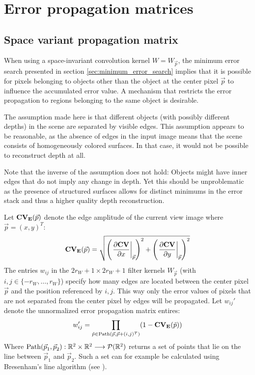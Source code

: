\chapter{Error propagation matrices}

\section{Space variant propagation matrix}

\label{sec:convolution_kernels}

\label{sec:kernels}
When using a space-invariant convolution kernel $W = W_{\vec p}$, the minimum error search presented in section \ref{sec:minimum_error_search} implies that it is possible for pixels belonging to objects other than the object at the center pixel $\vec p$ to influence the accumulated error value. A mechanism that restricts the error propagation to regions belonging to the same object is desirable.

The assumption made here is that different objects (with possibly different depths) in the scene are separated by visible edges. This assumption appears to be reasonable, as the absence of edges in the input image means that the scene consists of homogeneously colored surfaces. In that case, it would not be possible to reconstruct depth at all.

Note that the inverse of the assumption does not hold: Objects might have inner edges that do not imply any change in depth. Yet this should be unproblematic as the presence of structured surfaces allows for distinct minimums in the error stack and thus a higher quality depth reconstruction.

Let $\img{CV_{E}}(\vec p)$ denote the edge amplitude of the current view image where $\vec p = (x, y)^T$:
	$$\img{CV_{E}}(\vec p) = \sqrt{\left(\left.\frac{\partial \img{CV}}{\partial x}\right|_{\vec p}\right)^2 + \left(\left.\frac{\partial \img{CV}}{\partial y}\right|_{\vec p}\right)^2}$$
The entries $w_{ij}$ in the $2r_W + 1 \times 2 r_W + 1$ filter kernels $W_{\vec p}$ (with $i, j \in \{-r_W, \ldots, r_W\}$) specify how many edges are located between the center pixel $\vec p$ and the position referenced by $i, j$. This way only the error values of pixels that are not separated from the center pixel by edges will be propagated. Let $w_{ij}'$ denote the unnormalized error propagation matrix entires:
\begin{equation}
	w_{ij}' = \prod_{\tilde p \in \mathrm{Path}(\vec p, \vec p + (i, j)^T)} (1 - \img{CV_{E}}(\tilde p)) \label{eqn:error_matrix_bresenham}
\end{equation}
Where $\mathrm{Path}(\vec p_1, \vec p_2) : \R^2 \times \R^2 \longrightarrow \mathcal{P}(\R^2)$ returns a set of points that lie on the line between $\vec p_1$ and $\vec p_2$. Such a set can for example be calculated using Bresenham's line algorithm (see \cite{bresenham}).

